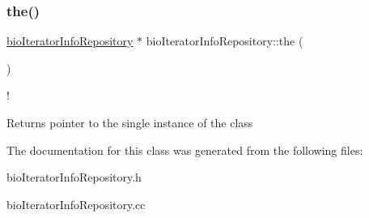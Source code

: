 \subsubsection{\texorpdfstring{the()}{the()}}
{\footnotesize\ttfamily \hyperlink{classbio_iterator_info_repository}{bio\+Iterator\+Info\+Repository} $\ast$ bio\+Iterator\+Info\+Repository\+::the (\begin{DoxyParamCaption}{ }\end{DoxyParamCaption})\hspace{0.3cm}{\ttfamily [static]}}

! \begin{DoxyReturn}{Returns}
pointer to the single instance of the class 
\end{DoxyReturn}


The documentation for this class was generated from the following files\+:\begin{DoxyCompactItemize}
\item 
bio\+Iterator\+Info\+Repository.\+h\item 
bio\+Iterator\+Info\+Repository.\+cc\end{DoxyCompactItemize}
